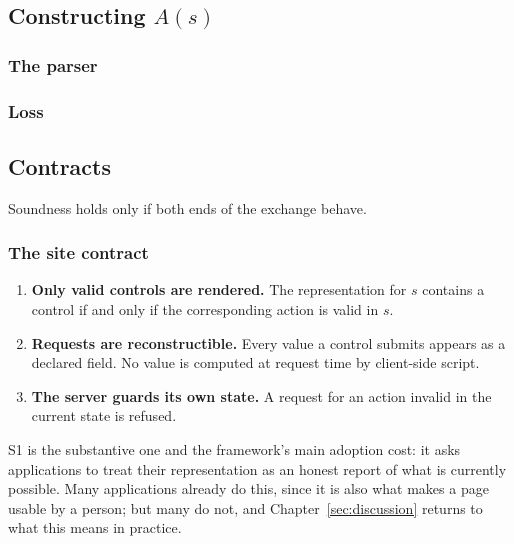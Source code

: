 \subsection{Constructing $A(s)$}



\subsubsection{The parser}\label{sec:design:parser}

\subsubsection{Loss}\label{sec:design:parser-loss}



\subsection{Contracts}\label{sec:design:contracts}

Soundness holds only if both ends of the exchange behave. 

\subsubsection{The site contract}\label{sec:design:site-contract}

\begin{enumerate}
    \item[\textbf{S1}] \textbf{Only valid controls are rendered.} The representation for $s$ contains a control if and only if the corresponding action is valid in $s$.
    \item[\textbf{S2}] \textbf{Requests are reconstructible.} Every value a control submits appears as a declared field. No value is computed at request time by client-side script. %
    \item[\textbf{S3}] \textbf{The server guards its own state.} A request for an action invalid in the current state is refused.
\end{enumerate}

S1 is the substantive one and the framework's main adoption cost: it asks applications to treat their representation as an honest report of what is currently possible. Many applications already do this, since it is also what makes a page usable by a person; but many do not, and Chapter~\ref{sec:discussion} returns to what this means in practice.

